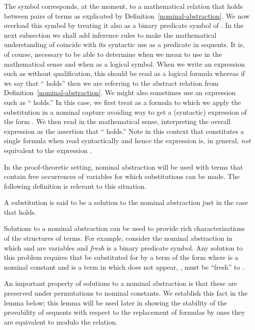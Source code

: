 The symbol  corresponds, at the moment, to a mathematical
relation that holds between pairs of terms as explicated by
Definition~\ref{nominal-abstraction}. We now overload this symbol by
treating it also as a binary predicate symbol of \logic. In the next
subsection we shall add inference rules to make the mathematical
understanding of  coincide with its syntactic use as a
predicate in sequents. It is, of course, necessary to be able to
determine when we mean to use  in the mathematical sense and
when as a logical symbol. When we write an expression such as  without qualification, this should be read as a logical formula
whereas if we say that `` holds'' then we are referring to
the abstract relation from Definition~\ref{nominal-abstraction}. We
might also sometimes use an expression such as `` holds.'' In this case, we first treat  as
a formula to which we apply the substitution  in a nominal
capture avoiding way to get a (syntactic) expression of the form
. We then read  in the mathematical sense,
interpreting the overall expression as the assertion that `` holds.'' Note in this context that  constitutes a
single formula when read syntactically and hence the expression
 is, in general, {\it not} equivalent to the
expression .

In the proof-theoretic setting, nominal abstraction will be used with
terms that contain free occurrences of variables for which
substitutions can be made. The following definition is relevant to
this situation.

\begin{definition}\label{nasolution}
A substitution  is said to be a solution to the nominal
abstraction  just in the case that  holds.
\end{definition}

Solutions to a nominal abstraction can be used to provide rich
characterizations of the structures of terms. For example, consider
the nominal abstraction
 in which  and  are
variables and {\sl fresh} is a binary predicate symbol.  Any solution
to this problem requires that  be
substituted for by a term of the form  where 
is a nominal constant and  is a term in which  does not appear,
\ie,  must be ``fresh'' to .

An important property of solutions to a nominal abstraction is that
these are preserved under permutations to nominal constants. We
establish this fact in the lemma below; this lemma will be used later
in showing the stability of the provability of sequents with
respect to the replacement of formulas by ones they are equivalent to
modulo the  relation.

